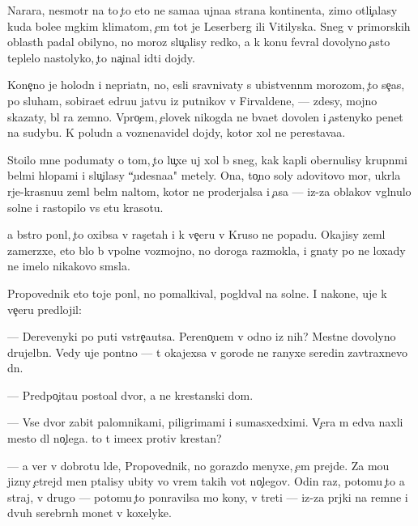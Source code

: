 \documentclass[10pt]{book}
\begin{document}
Narara, nesmotr{\ia} na to {\c}to eto ne sama{\y}a {\y}ujna{\y}a strana kontinenta, zimo{\y} otli{\c}alasy kuda bole{\y}e m{\ia}gkim klimatom, {\c}em tot je Leserberg ili Vitilyska. Sneg v primorskih oblast{\ia}h padal obilyno, no moroz{\yi} slu{\c}alisy redko, a k kon{\q}u fevral{\ia} dovolyno {\c}asto teplelo nastolyko, {\c}to na{\c}inal idti dojdy.

Kone{\c}no je holodn{\yi}{\y} i nepri{\y}atn{\yi}{\y}, no, {\y}esli sravnivaty s ubi{\y}stvenn{\yi}m morozom, {\c}to se{\y}{\c}as, po sluham, sobira{\y}et {\x}edru{\y}u jatvu iz putnikov v Firvaldene, — zdesy, mojno skazaty, b{\yi}l ra{\y} zemno{\y}. Vpro{\c}em, {\c}elovek nikogda ne b{\yi}va{\y}et dovolen i {\c}astenyko pen{\ia}{\y}et na sudybu. K poludn{\iu} {\y}a voznenavidel dojdy, kotor{\yi}{\y} xol ne perestava{\y}a.

Sto{\y}ilo mne podumaty o tom, {\c}to lu{\c}xe uj xol b{\yi} sneg, kak kapli obernulisy krupn{\yi}mi bel{\yi}mi hlop{\y}ami i slu{\c}ilasy ``{\c}udesna{\y}a" metely. Ona, to{\c}no soly {\Y}adovitovo mor{\ia}, ukr{\yi}la r{\yi}je-krasnu{\y}u zeml{\iu} bel{\yi}m nal{\e}tom, kotor{\yi}{\y} ne proderjalsa i {\c}asa — iz-za oblakov v{\yi}gl{\ia}nulo soln{\q}e i rastopilo vs{\iu} etu krasotu.

{\Y}a b{\yi}stro pon{\ia}l, {\c}to oxibsa v ras{\c}etah i k ve{\c}eru v Kruso ne popadu. Okajisy zeml{\ia} zamerzxe{\y}, eto b{\yi}lo b{\yi} vpolne vozmojno, no doroga razmokla, i gnaty po ne{\y} loxady ne imelo nikakovo sm{\yi}sla.

Propovednik eto toje pon{\ia}l, no pomalkival, pogl{\ia}d{\yi}val na soln{\q}e. I nakone{\q}, uje k ve{\c}eru predlojil:

— Derevenyki po puti vstre{\c}a{\y}utsa. Pereno{\c}u{\y}em v odno{\y} iz nih? Mestn{\yi}{\y}e dovolyno drujel{\iu}bn{\yi}. Vedy uje pon{\ia}tno — t{\yi} okajexsa v gorode ne ranyxe seredin{\yi} zavtraxnevo dn{\ia}.

— Predpo{\c}ita{\y}u posto{\y}al{\yi}{\y} dvor, a ne krest{\y}anski{\y} dom.

— Vse dvor{\yi} zabit{\yi} palomnikami, piligrimami i sumasxedximi. V{\c}era m{\yi} {\y}edva naxli mesto dl{\ia} no{\c}lega. {\C}to t{\yi} ime{\y}ex protiv krest{\y}an?

— {\Y}a ver{\iu} v dobrotu l{\iu}de{\y}, Propovednik, no gorazdo menyxe, {\c}em prejde. Za mo{\y}u jizny {\c}et{\yi}rejd{\yi} men{\ia} p{\yi}talisy ubity vo vrem{\ia} takih vot no{\c}legov. Odin raz, potomu {\c}to {\y}a straj, v drugo{\y} — potomu {\c}to ponravilsa mo{\y} kony, v treti{\y} — iz-za pr{\ia}jki na remne i dvuh serebr{\ia}n{\yi}h monet v koxelyke.
\end{document}
